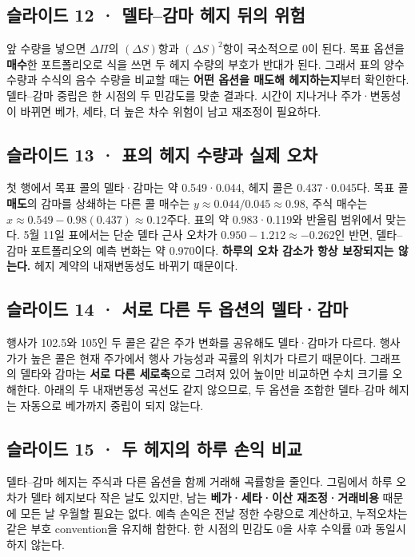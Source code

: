 \documentclass[11pt,a4paper]{article}
\begin{document}
\subsection{슬라이드 12 · 델타–감마 헤지 뒤의 위험}
앞 수량을 넣으면 $\Delta\Pi$의 $(\Delta S)$항과 $(\Delta S)^2$항이 국소적으로 0이 된다. 목표 옵션을 \textbf{매수}한 포트폴리오로 식을 쓰면 두 헤지 수량의 부호가 반대가 된다. 그래서 표의 양수 수량과 수식의 음수 수량을 비교할 때는 \textbf{어떤 옵션을 매도해 헤지하는지}부터 확인한다. 델타–감마 중립은 한 시점의 두 민감도를 맞춘 결과다. 시간이 지나거나 주가·변동성이 바뀌면 베가, 세타, 더 높은 차수 위험이 남고 재조정이 필요하다.\par

\subsection{슬라이드 13 · 표의 헤지 수량과 실제 오차}
첫 행에서 목표 콜의 델타·감마는 약 0.549·0.044, 헤지 콜은 0.437·0.045다. 목표 콜 \textbf{매도}의 감마를 상쇄하는 다른 콜 매수는 $y\approx0.044/0.045\approx0.98$, 주식 매수는 $x\approx0.549-0.98(0.437)\approx0.12$주다. 표의 약 0.983·0.119와 반올림 범위에서 맞는다. 5월 11일 표에서는 단순 델타 근사 오차가 $0.950-1.212\approx-0.262$인 반면, 델타–감마 포트폴리오의 예측 변화는 약 0.970이다. \textbf{하루의 오차 감소가 항상 보장되지는 않는다.} 헤지 계약의 내재변동성도 바뀌기 때문이다.\par

\subsection{슬라이드 14 · 서로 다른 두 옵션의 델타·감마}
행사가 102.5와 105인 두 콜은 같은 주가 변화를 공유해도 델타·감마가 다르다. 행사가가 높은 콜은 현재 주가에서 행사 가능성과 곡률의 위치가 다르기 때문이다. 그래프의 델타와 감마는 \textbf{서로 다른 세로축}으로 그려져 있어 높이만 비교하면 수치 크기를 오해한다. 아래의 두 내재변동성 곡선도 같지 않으므로, 두 옵션을 조합한 델타–감마 헤지는 자동으로 베가까지 중립이 되지 않는다.\par

\subsection{슬라이드 15 · 두 헤지의 하루 손익 비교}
델타–감마 헤지는 주식과 다른 옵션을 함께 거래해 곡률항을 줄인다. 그림에서 하루 오차가 델타 헤지보다 작은 날도 있지만, 남는 \textbf{베가·세타·이산 재조정·거래비용} 때문에 모든 날 우월할 필요는 없다. 예측 손익은 전날 정한 수량으로 계산하고, 누적오차는 같은 부호 convention을 유지해 합한다. 한 시점의 민감도 0을 사후 수익률 0과 동일시하지 않는다.\par
\end{document}
